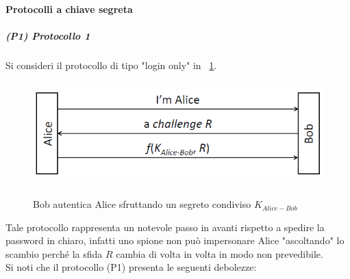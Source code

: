 \paragraph{Protocolli a chiave segreta}
\subparagraph{(P1) Protocollo 1}
Si consideri il protocollo di tipo "login only" in \figurename~\ref{fig:ImgS11bis}.
\begin{figure}[htbp]
	\centering%
	\subfigure%
	{\includegraphics[height=4cm, width=12cm, keepaspectratio]{Immagini/autenticazione/ImgS11bis.png}}
	\caption{Bob autentica Alice sfruttando un segreto condiviso $K_{Alice-Bob}$\label{fig:ImgS11bis}} 	
\end{figure}
Tale protocollo rappresenta un notevole passo in avanti rispetto a spedire la password in chiaro, infatti uno spione non può impersonare Alice "ascoltando" lo scambio perché la sfida $R$ cambia di volta in volta in modo non prevedibile.\\
Si noti che il protocollo (P1) presenta le seguenti debolezze:
